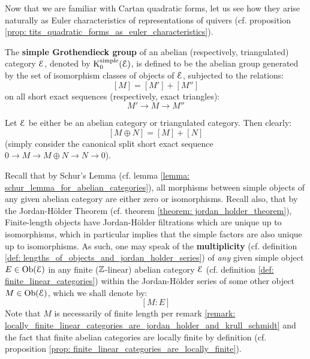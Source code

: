             Now that we are familiar with Cartan quadratic forms, let us see how they arise naturally as Euler characteristics of representations of quivers (cf. proposition \ref{prop: tits_quadratic_forms_as_euler_characteristics}). 
            \begin{definition} \label{def: simple_grothendieck_groups}
                The \textbf{simple Grothendieck group} of an abelian (respectively, triangulated) category $\mathcal{E}$, denoted by $\mathrm{K}_0^{\mathrm{simple}}(\mathcal{E})$, is defined to be the abelian group generated by the set of isomorphism classes of objects of $\mathcal{E}$, subjected to the relations:
                    $$[M] = [M'] + [M'']$$
                on all short exact sequences (respectively, exact triangles):
                    $$M' \to M \to M''$$
            \end{definition}
            \begin{remark}
                Let $\mathcal{E}$ be either be an abelian category or triangulated category. Then clearly:
                    $$[M \oplus N] = [M] + [N]$$
                (simply consider the canonical split short exact sequence $0 \to M \to M \oplus N \to N \to 0$).
            \end{remark}
            \begin{convention}
                Recall that by Schur's Lemma (cf. lemma \ref{lemma: schur_lemma_for_abelian_categories}), all morphisms between simple objects of any given abelian category are either zero or isomorphisms. Recall also, that by the Jordan-H\"older Theorem (cf. theorem \ref{theorem: jordan_holder_theorem}), Finite-length objects have Jordan-H\"older filtrations which are unique up to isomorphisms, which in particular implies that the simple factors are also unique up to isomorphisms. As such, one may speak of the \textbf{multiplicity} (cf. definition \ref{def: lengths_of_objects_and_jordan_holder_series}) of \textit{any} given simple object $E \in \mathrm{Ob}(\mathcal{E})$ in any finite ($\mathbb{Z}$-linear) abelian category $\mathcal{E}$ (cf. definition \ref{def: finite_linear_categories}) within the Jordan-H\"older series of some other object $M \in \mathrm{Ob}(\mathcal{E})$, which we shall denote by:
                    $$[M : E]$$
                Note that $M$ is necessarily of finite length per remark \ref{remark: locally_finite_linear_categories_are_jordan_holder_and_krull_schmidt} and the fact that finite abelian categories are locally finite by definition (cf. proposition \ref{prop: finite_linear_categories_are_locally_finite}).
            \end{convention}
